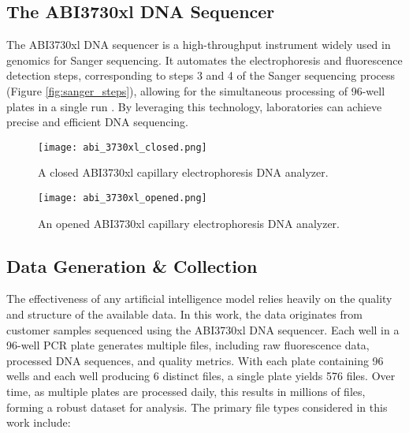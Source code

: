 \subsection{The ABI3730xl DNA Sequencer}
The ABI3730xl DNA sequencer is a high-throughput instrument widely used in genomics for Sanger sequencing. It automates the electrophoresis and fluorescence detection steps, corresponding to steps 3 and 4 of the Sanger sequencing process (Figure \ref{fig:sanger_steps}), allowing for the simultaneous processing of 96-well plates in a single run \cite{smith_capillary_sequencing,abi3730xl_overview}. By leveraging this technology, laboratories can achieve precise and efficient DNA sequencing. 
\begin{figure}[h]
\centering
\texttt{[image: abi\_3730xl\_closed.png]}
\caption{A closed ABI3730xl capillary electrophoresis DNA analyzer.}
\label{fig:abi_3730xl_closed}
\end{figure}

\begin{figure}[h]
\centering
\texttt{[image: abi\_3730xl\_opened.png]}
\caption{An opened ABI3730xl capillary electrophoresis DNA analyzer.}
\label{fig:abi_3730xl_opened}
\end{figure}

\subsection{Data Generation \& Collection}

The effectiveness of any artificial intelligence model relies heavily on the quality and structure of the available data. In this work, the data originates from customer samples sequenced using the ABI3730xl DNA sequencer. Each well in a 96-well PCR plate generates multiple files, including raw fluorescence data, processed DNA sequences, and quality metrics. With each plate containing 96 wells and each well producing 6 distinct files, a single plate yields 576 files. Over time, as multiple plates are processed daily, this results in millions of files, forming a robust dataset for analysis.
The primary file types considered in this work include:

